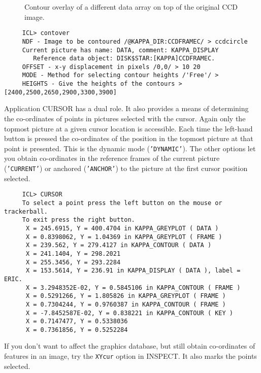 {\begin{figure}[htb]
\caption{Contour overlay of a different data array on top of the original CCD
image.}
\label{fi:agi7}
\vspace{4.4in}
\end{figure}

\small
\begin{verbatim}
     ICL> contover
     NDF - Image to be contoured /@KAPPA_DIR:CCDFRAMEC/ > ccdcircle
     Current picture has name: DATA, comment: KAPPA_DISPLAY
        Reference data object: DISK$STAR:[KAPPA]CCDFRAMEC.
     OFFSET - x-y displacement in pixels /0,0/ > 10 20
     MODE - Method for selecting contour heights /'Free'/ >
     HEIGHTS - Give the heights of the contours > [2400,2500,2650,2900,3300,3900]
\end{verbatim}
\normalsize

Application CURSOR has a dual role. It also provides a means of
determining the co-ordinates of points in pictures selected with the
cursor. Again only the topmost picture at a given cursor location is
accessible.  Each time the left-hand button is pressed the co-ordinates
of the position in the topmost picture at that point is presented.
This is the dynamic mode ({\tt 'DYNAMIC'}).  The other options let you
obtain co-ordinates in the reference frames of the current picture
({\tt 'CURRENT'}) or anchored ({\tt 'ANCHOR'}) to the picture at the first
cursor position selected.

\small
\begin{verbatim}
     ICL> CURSOR
     To select a point press the left button on the mouse or trackerball.
     To exit press the right button.
      X = 245.6915, Y = 400.4704 in KAPPA_GREYPLOT ( DATA )
      X = 0.8398062, Y = 1.04369 in KAPPA_GREYPLOT ( FRAME )
      X = 239.562, Y = 279.4127 in KAPPA_CONTOUR ( DATA )
      X = 241.1404, Y = 298.2021
      X = 255.3456, Y = 293.2284
      X = 153.5614, Y = 236.91 in KAPPA_DISPLAY ( DATA ), label = ERIC.
      X = 3.2948352E-02, Y = 0.5845106 in KAPPA_CONTOUR ( FRAME )
      X = 0.5291266, Y = 1.805826 in KAPPA_GREYPLOT ( FRAME )
      X = 0.7304244, Y = 0.9760387 in KAPPA_CONTOUR ( FRAME )
      X = -7.8452587E-02, Y = 0.838221 in KAPPA_CONTOUR ( KEY )
      X = 0.7147477, Y = 0.5338036
      X = 0.7361856, Y = 0.5252284
\end{verbatim}
\normalsize
If you don't want to affect the graphics database, but still obtain
co-ordinates of features in an image, try the {\tt XYcur} option in
INSPECT.  It also marks the points selected. 

}

